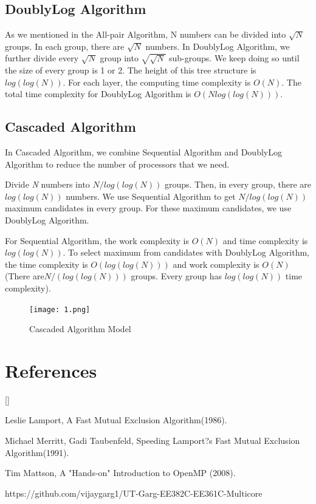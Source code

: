 \documentclass[twoside]{article}
\def\beginrefs{\begin{list}%
        {[\arabic{equation}]}{\usecounter{equation}
         \setlength{\leftmargin}{2.0truecm}\setlength{\labelsep}{0.4truecm}%
         \setlength{\labelwidth}{1.6truecm}}}
\def\endrefs{\end{list}}
\def\bibentry#1{\item[\hbox{[#1]}]}
\begin{document}
\subsection{DoublyLog Algorithm}
As we mentioned in the All-pair Algorithm, N numbers can be divided into $\sqrt{N}$ groups. In each group, there are $\sqrt{N}$ numbers. In DoublyLog Algorithm, we further divide every $\sqrt{N}$ group into  $\sqrt{\sqrt{N}}$ sub-groups. We keep doing so until the size of every group is 1 or 2. The height of this tree structure is $log(log(N))$. For each layer, the computing time complexity is $O(N)$. The total time complexity for DoublyLog Algorithm is $O(Nlog(log(N)))$.

\subsection{Cascaded Algorithm}
In Cascaded Algorithm, we combine Sequential Algorithm and DoublyLog Algorithm to reduce the number of processors that we need.

Divide {\it N} numbers into $N/log(log(N))$ groups. Then, in every group, there are $log(log(N))$ numbers. We use Sequential Algorithm to get $N/log(log(N))$ maximum candidates in every group. For these maximum candidates, we use DoublyLog Algorithm.

For Sequential Algorithm, the work complexity is $O(N)$ and time complexity is $log(log(N))$. To select maximum from candidates with DoublyLog Algorithm, the time complexity is  $O(log(log(N)))$ and work complexity is $O(N)$ (There are$N/(log(log(N)))$ groups. Every group has $log(log(N))$ time complexity).

\begin{figure}[!ht]
  \centering
    \texttt{[image: 1.png]}
  \caption{Cascaded Algorithm Model}
\end{figure}

\section*{References}
\beginrefs
\bibentry{1}{\sc Leslie Lamport}, A Fast Mutual Exclusion Algorithm(1986).
\bibentry{2}{\sc Michael Merritt}, {\sc Gadi Taubenfeld}, Speeding Lamport?s Fast Mutual Exclusion Algorithm(1991).
\bibentry{3}{\sc Tim Mattson}, A "Hands-on" Introduction to OpenMP (2008).
\bibentry{4} https://github.com/vijaygarg1/UT-Garg-EE382C-EE361C-Multicore
\endrefs
\end{document}
